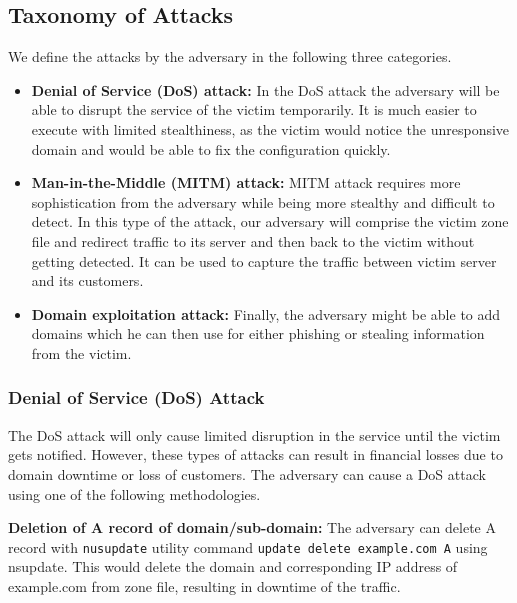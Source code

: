 \subsection{Taxonomy of Attacks}
We define the attacks by the adversary in the following three categories. 

\begin{itemize}
\item \textbf{Denial of Service (DoS) attack:} In the DoS attack the adversary will be able to disrupt the service of the victim temporarily. It is much easier to execute with limited stealthiness, as the victim would notice the unresponsive domain and would be able to fix the configuration quickly. 


\item \textbf{Man-in-the-Middle (MITM) attack:} MITM attack requires more sophistication from the adversary while being more stealthy and difficult to detect. In this type of the attack, our adversary will comprise the victim zone file and redirect traffic to its server and then back to the victim without getting detected. It can be used to capture the traffic between victim server and its customers.  

\item \textbf{Domain exploitation attack:} Finally, the adversary might be able to add domains which he can then use for either phishing or stealing information from the victim.  
\end{itemize}


\subsubsection{Denial of Service (DoS) Attack} 
The DoS attack will only cause limited disruption in the service until the victim gets notified. However, these types of attacks can result in financial losses due to domain downtime or loss of customers. The adversary can cause a DoS attack using one of the following methodologies. 

\textbf{Deletion of A record of domain/sub-domain:} The adversary can delete A record with \texttt{nusupdate} utility command \texttt{update delete example.com A} using nsupdate. This would delete the domain and corresponding IP address of example.com from zone file, resulting in downtime of the traffic. 


